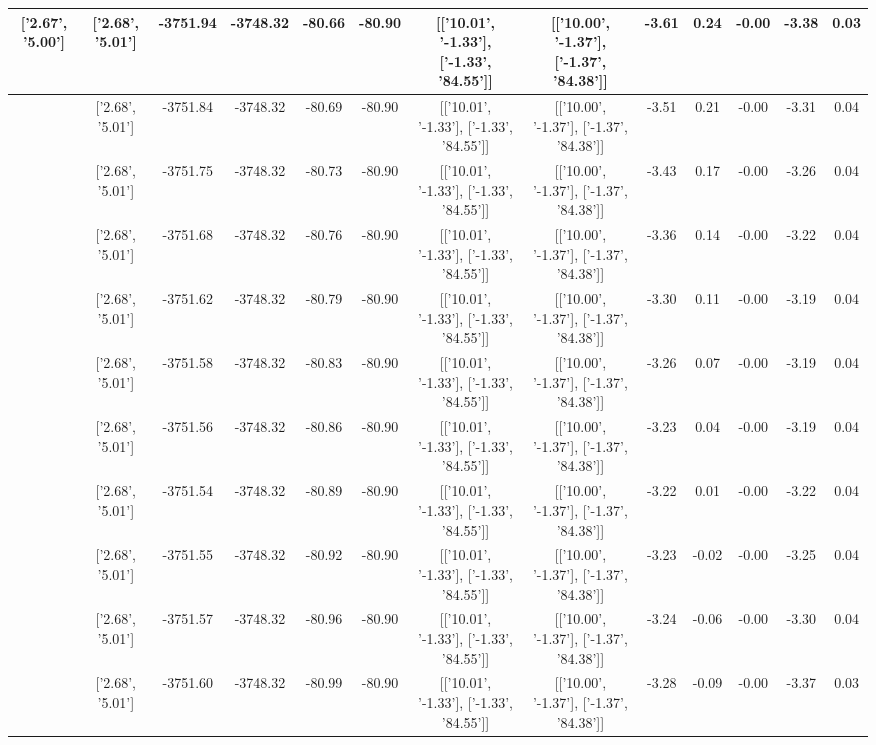 \begin{table}[htbp]
\begin{adjustbox}{angle=90}
\begin{tabular}{|c|c|c|c|c|c|c|c|c|c|c|c|c|}
 ['2.67', '5.00'] & ['2.68', '5.01'] & -3751.94 & -3748.32 & -80.66 & -80.90 & [['10.01', '-1.33'], ['-1.33', '84.55']] & [['10.00', '-1.37'], ['-1.37', '84.38']] & -3.61 & 0.24 & -0.00 & -3.38 & 0.03\\ \hline
 ['2.68', '5.00'] & ['2.68', '5.01'] & -3751.84 & -3748.32 & -80.69 & -80.90 & [['10.01', '-1.33'], ['-1.33', '84.55']] & [['10.00', '-1.37'], ['-1.37', '84.38']] & -3.51 & 0.21 & -0.00 & -3.31 & 0.04\\ \hline
 ['2.68', '5.00'] & ['2.68', '5.01'] & -3751.75 & -3748.32 & -80.73 & -80.90 & [['10.01', '-1.33'], ['-1.33', '84.55']] & [['10.00', '-1.37'], ['-1.37', '84.38']] & -3.43 & 0.17 & -0.00 & -3.26 & 0.04\\ \hline
 ['2.68', '5.00'] & ['2.68', '5.01'] & -3751.68 & -3748.32 & -80.76 & -80.90 & [['10.01', '-1.33'], ['-1.33', '84.55']] & [['10.00', '-1.37'], ['-1.37', '84.38']] & -3.36 & 0.14 & -0.00 & -3.22 & 0.04\\ \hline
 ['2.68', '5.00'] & ['2.68', '5.01'] & -3751.62 & -3748.32 & -80.79 & -80.90 & [['10.01', '-1.33'], ['-1.33', '84.55']] & [['10.00', '-1.37'], ['-1.37', '84.38']] & -3.30 & 0.11 & -0.00 & -3.19 & 0.04\\ \hline
 ['2.68', '5.01'] & ['2.68', '5.01'] & -3751.58 & -3748.32 & -80.83 & -80.90 & [['10.01', '-1.33'], ['-1.33', '84.55']] & [['10.00', '-1.37'], ['-1.37', '84.38']] & -3.26 & 0.07 & -0.00 & -3.19 & 0.04\\ \hline
 ['2.68', '5.01'] & ['2.68', '5.01'] & -3751.56 & -3748.32 & -80.86 & -80.90 & [['10.01', '-1.33'], ['-1.33', '84.55']] & [['10.00', '-1.37'], ['-1.37', '84.38']] & -3.23 & 0.04 & -0.00 & -3.19 & 0.04\\ \hline
 ['2.68', '5.01'] & ['2.68', '5.01'] & -3751.54 & -3748.32 & -80.89 & -80.90 & [['10.01', '-1.33'], ['-1.33', '84.55']] & [['10.00', '-1.37'], ['-1.37', '84.38']] & -3.22 & 0.01 & -0.00 & -3.22 & 0.04\\ \hline
 ['2.69', '5.01'] & ['2.68', '5.01'] & -3751.55 & -3748.32 & -80.92 & -80.90 & [['10.01', '-1.33'], ['-1.33', '84.55']] & [['10.00', '-1.37'], ['-1.37', '84.38']] & -3.23 & -0.02 & -0.00 & -3.25 & 0.04\\ \hline
 ['2.69', '5.01'] & ['2.68', '5.01'] & -3751.57 & -3748.32 & -80.96 & -80.90 & [['10.01', '-1.33'], ['-1.33', '84.55']] & [['10.00', '-1.37'], ['-1.37', '84.38']] & -3.24 & -0.06 & -0.00 & -3.30 & 0.04\\ \hline
 ['2.69', '5.01'] & ['2.68', '5.01'] & -3751.60 & -3748.32 & -80.99 & -80.90 & [['10.01', '-1.33'], ['-1.33', '84.55']] & [['10.00', '-1.37'], ['-1.37', '84.38']] & -3.28 & -0.09 & -0.00 & -3.37 & 0.03\\ \hline

\end{tabular}
\end{adjustbox}
\end{table}
